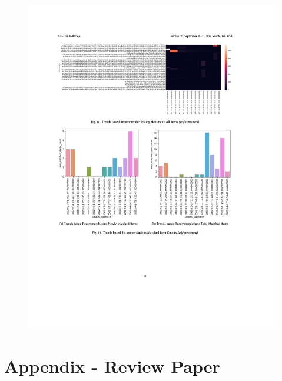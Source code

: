 \begin{figure}[h!]
\centering
\includegraphics[width=\textwidth]{images/appendix/papers/trends/Exploration of the possibility of infusing Social Media Trends into generating NFT Recommendations 13.jpeg}
\end{figure}


\newpage
\chapter{Appendix - Review Paper}

